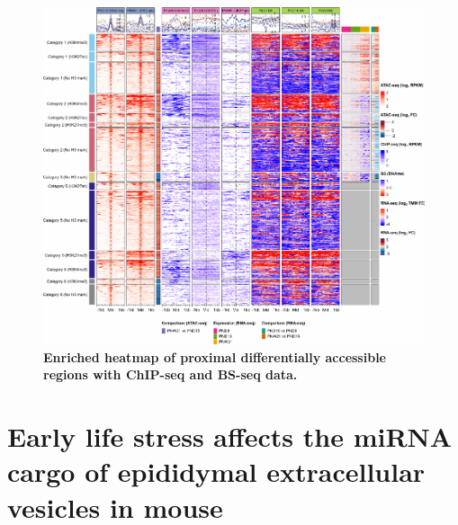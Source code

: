 \documentclass[12pt,twoside]{reedthesis}
\begin{document}
\begin{figure}[htbp]

{\centering \includegraphics{thesis_files/figure-latex/dn7-1} 

}

\caption[Enriched heatmap of proximal DARs with ChIP-seq and BS-seq data]{\textbf{Enriched heatmap of proximal differentially accessible regions with ChIP-seq and BS-seq data.}}\label{fig:dn7}
\end{figure}

\hypertarget{chapter2}{%
\chapter{Early life stress affects the miRNA cargo of epididymal extracellular vesicles in mouse}\label{chapter2}}
\end{document}
